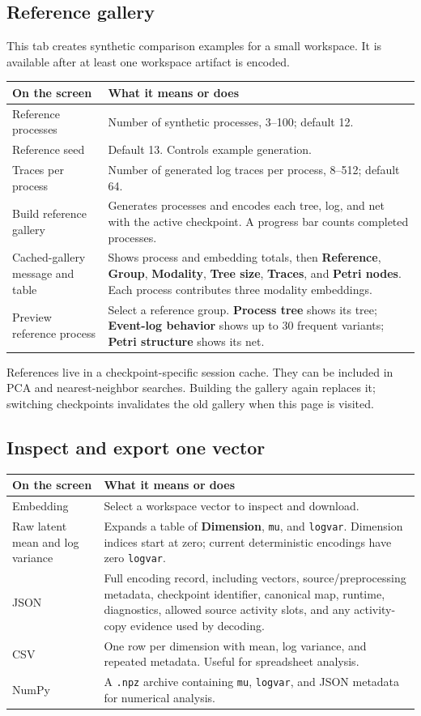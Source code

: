 \documentclass[11pt,a4paper]{article}
\makeatletter
\newcommand{\ui}[1]{\textbf{#1}}
\newcommand{\code}[1]{\nolinkurl{#1}}
\newenvironment{controls}{%
  \small\begin{longtable}{@{}>{\raggedright\arraybackslash}p{.34\linewidth}
    >{\raggedright\arraybackslash}p{.62\linewidth}@{}}
  \toprule\textbf{On the screen} & \textbf{What it means or does}\\\midrule\endhead
  \bottomrule\endfoot
}{\end{longtable}\normalsize}
\makeatother
\begin{document}
\subsection{Reference gallery}
This tab creates synthetic comparison examples for a small workspace. It is
available after at least one workspace artifact is encoded.
\begin{controls}
Reference processes & Number of synthetic processes, 3--100; default 12.\\
Reference seed & Default 13. Controls example generation.\\
Traces per process & Number of generated log traces per process, 8--512;
default 64.\\
Build reference gallery & Generates processes and encodes each tree, log,
and net with the active checkpoint. A progress bar counts completed processes.\\
Cached-gallery message and table & Shows process and embedding totals, then
\ui{Reference}, \ui{Group}, \ui{Modality}, \ui{Tree size}, \ui{Traces},
and \ui{Petri nodes}. Each process contributes three modality embeddings.\\
Preview reference process & Select a reference group. \ui{Process tree}
shows its tree; \ui{Event-log behavior} shows up to 30 frequent variants;
\ui{Petri structure} shows its net.\\
\end{controls}

References live in a checkpoint-specific session cache. They can be included
in PCA and nearest-neighbor searches. Building the gallery again replaces it;
switching checkpoints invalidates the old gallery when this page is visited.

\subsection{Inspect and export one vector}
\begin{controls}
Embedding & Select a workspace vector to inspect and download.\\
Raw latent mean and log variance & Expands a table of \ui{Dimension},
\code{mu}, and \code{logvar}. Dimension indices start at zero; current
deterministic encodings have zero \code{logvar}.\\
JSON & Full encoding record, including vectors, source/preprocessing metadata,
checkpoint identifier, canonical map, runtime, diagnostics, allowed source
activity slots, and any activity-copy evidence used by decoding.\\
CSV & One row per dimension with mean, log variance, and repeated metadata.
Useful for spreadsheet analysis.\\
NumPy & A \code{.npz} archive containing \code{mu}, \code{logvar}, and
JSON metadata for numerical analysis.\\
\end{controls}
\end{document}

